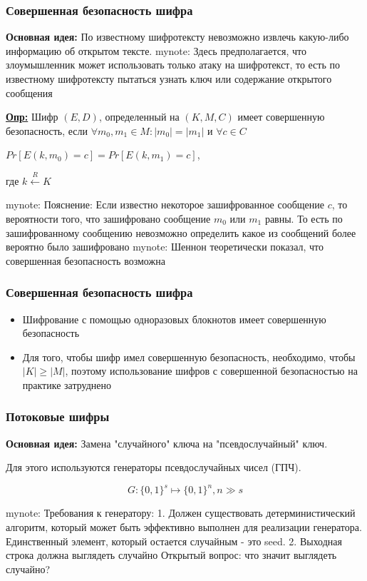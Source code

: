 \documentclass{beamer}
\newcommand{\longdef}[1]{{\textbf{\underline{Опр:}} #1}}
\newcommand{\set}[1]{{\lbrace #1 \rbrace}}
\newcommand{\mynote}[1]{mynote: #1}
\newcommand{\mynote}[1]{}
\begin{document}
\begin{frame}
  \frametitle{Совершенная безопасность шифра}

  \textbf{Основная идея:} По известному шифротексту невозможно извлечь какую-либо информацию об открытом тексте.
  \mynote{Здесь предполагается, что злоумышленник может использовать только атаку
  на шифротекст, то есть по известному шифротексту пытаться узнать ключ или
  содержание открытого сообщения}
  \vspace{2em}

  \longdef{Шифр $(E,D)$, определенный на $(K,M,C)$ имеет совершенную безопасность, если \newline
    $\forall m_{0},m_{1} \in M:  |m_{0}| = |m_{1}|$ и $\forall c \in C$
      \begin{center} $Pr[E(k,m_{0}) = c] = Pr[E(k,m_{1}) = c]$, \end{center}
      где $k \stackrel{R}{\longleftarrow}K$}

  \mynote{Пояснение: Если известно некоторое зашифрованное сообщение $c$, то
    вероятности того, что зашифровано сообщение $m_{0}$ или $m_{1}$ равны. То
    есть по зашифрованному сообщению невозможно определить какое из сообщений
    более вероятно было зашифровано}
  \mynote{Шеннон теоретически показал, что совершенная безопасность возможна}

\end{frame}


\begin{frame}
  \frametitle{Совершенная безопасность шифра}

  \begin{itemize}
    \item{Шифрование с помощью одноразовых блокнотов имеет совершенную безопасность}
    \item{Для того, чтобы шифр имел совершенную безопасность, необходимо, чтобы $|K| \ge |M|$, поэтому использование
          шифров с совершенной безопасностью на практике затруднено}
  \end{itemize}
\end{frame}


\begin{frame}
  \frametitle{Потоковые шифры}

  \textbf{Основная идея:} Замена "случайного" ключа на "псевдослучайный" ключ.
  \vspace{1em}

  Для этого используются генераторы псевдослучайных чисел (ГПЧ).
  \vspace{1em}

  \[G:\set{0,1}^{s} \mapsto \set{0,1}^{n}, n \gg s\]

  \mynote{Требования к генератору: 
    1. Должен существовать детерминистический алгоритм, который может быть эффективно выполнен для реализации генератора.
       Единственный элемент, который остается случайным - это seed.
    2. Выходная строка должна выглядеть случайно
    Открытый вопрос: что значит выглядеть случайно?
  }

\end{frame}
\end{document}
